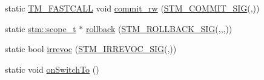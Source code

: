 \begin{DoxyCompactItemize}
static \hyperlink{platform_8hpp_a8b5d728e6eed8f368f9966f637d2f719}{T\-M\-\_\-\-F\-A\-S\-T\-C\-A\-L\-L} void \hyperlink{structanonymous__namespace_02byear_8cpp_03_1_1ByEAR_aa16fec84911275843f536b75a1a7173d}{commit\-\_\-rw} (\hyperlink{include_2stm_2macros_8hpp_a1b8304eb1082517c7dc31f3534b72343}{S\-T\-M\-\_\-\-C\-O\-M\-M\-I\-T\-\_\-\-S\-I\-G}(,))
\item 
static \hyperlink{namespacestm_a91badf88c88aacc831b01a315435a255}{stm\-::scope\-\_\-t} $\ast$ \hyperlink{structanonymous__namespace_02byear_8cpp_03_1_1ByEAR_ad13d58b942fe75cb592e184e27ddaa4c}{rollback} (\hyperlink{include_2stm_2macros_8hpp_a1c36a48149c84f90d5bca01019950ca9}{S\-T\-M\-\_\-\-R\-O\-L\-L\-B\-A\-C\-K\-\_\-\-S\-I\-G}(,,,))
\item 
static bool \hyperlink{structanonymous__namespace_02byear_8cpp_03_1_1ByEAR_a2cd872375172507de1d89dd4fa106bc1}{irrevoc} (\hyperlink{include_2stm_2macros_8hpp_acf117c2df6442342f6603e1a12fa3b5c}{S\-T\-M\-\_\-\-I\-R\-R\-E\-V\-O\-C\-\_\-\-S\-I\-G}(,))
\item 
static void \hyperlink{structanonymous__namespace_02byear_8cpp_03_1_1ByEAR_a183e3e8d26238732b025a64ab89d62eb}{on\-Switch\-To} ()
\end{DoxyCompactItemize}


